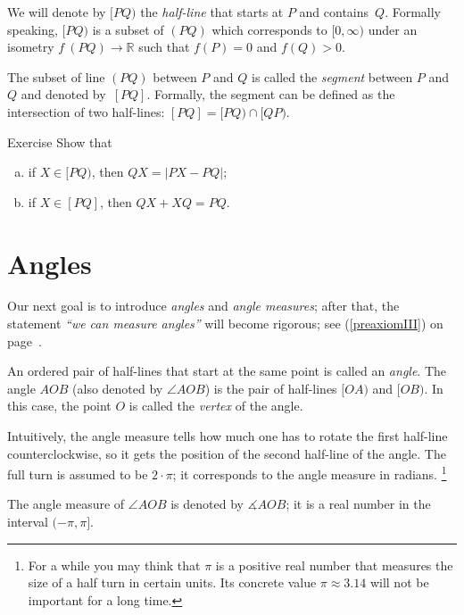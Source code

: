 We will denote by $[P Q)$ the \emph{half-line}
that starts at $P$ and contains~$Q$. 
Formally speaking, $[P Q)$ is a subset of $(P Q)$ which corresponds to $[0,\infty)$ under an isometry $f\:(P Q)\to \mathbb{R}$ such that $f(P)=0$ and $f(Q)>0$.

The subset of line $(P Q)$ between $P$ and $Q$ is called the \emph{segment} between $P$ and $Q$ and denoted by~$[P Q]$.
Formally, the segment can be defined as the intersection of two half-lines: $[P Q]=[P Q)\cap[Q P)$.

\begin{thm}{Exercise}\label{ex:trig==}
Show that 
\begin{enumerate}[(a)]
\item if $X\in [PQ)$, then 
$QX=|PX-PQ|$;
\item if $X\in [PQ]$, then 
$QX+XQ=PQ$.
\end{enumerate}

\end{thm}


\section*{Angles}

Our next goal is to introduce {}\emph{angles} and {}\emph{angle measures}; 
after that, the statement {}\emph{``we can measure angles''} will become rigorous;
see (\ref{preaxiomIII}) on page~\pageref{preaxiomIII}.

An ordered pair of half-lines that start at the same point is called an \emph{angle}.
The angle $AOB$ (also denoted by $\angle AOB$) is the pair of half-lines $[OA)$ and $[OB)$.
In this case, the point $O$ is called the \emph{vertex} of the angle.

Intuitively, the angle measure tells how much one has to rotate the first half-line counterclockwise, so it gets the position of the second half-line of the angle. 
The full turn is assumed to be $2\cdot\pi$;
it corresponds to the angle measure in radians.%
\footnote{For a while you may think that $\pi$ is a positive real number that measures the size of a half turn in certain units. Its concrete value $\pi\approx 3.14$ will not be important for a long time.}

The angle measure of $\angle AOB$ is denoted by $\measuredangle AOB$;
it is a real number in the interval $(-\pi,\pi]$. 

